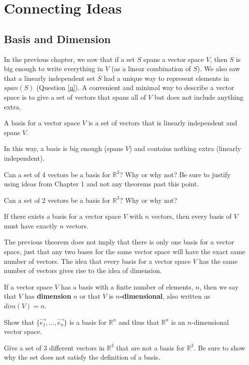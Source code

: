\chapter{Connecting Ideas}

\section{Basis and Dimension}
In the previous chapter, we saw that if a set $S$ spans a vector space $V$, then $S$ is big enough to write everything in $V$ (as a linear combination of $S$). We also saw that a linearly independent set $S$ had a unique way to represent elements in $span(S)$ (Question \ref{u}). A convenient and minimal way to describe a vector space is to give a set of vectors that spans all of $V$ but does not include anything extra.
\begin{definition} A basis for a vector space $V$ is a set of vectors that is linearly independent and spans $V$.
\end{definition}
In this way, a basis is big enough (spans $V$) and contains nothing extra (linearly independent).

\bq Can a set of 4 vectors be a basis for $\mathbb{R}^3$? Why or why not? Be sure to justify using ideas from Chapter 1 and not any theorems past this point.
\eq

\bq Can a set of 2 vectors be a basis for $\mathbb{R}^3$? Why or why not?
\eq

\begin{theorem}
If there exists a basis for a vector space $V$ with $n$ vectors, then every basis of $V$ must have exactly $n$ vectors.
\end{theorem}
The previous theorem does not imply that there is only one basis for a vector space, just that any two bases for the same vector space will have the exact same number of vectors. The idea that every basis for a vector space $V$ has the same number of vectors gives rise to the idea of dimension.
\begin{definition} If a vector space $V$ has a basis with a finite number of elements, $n$, then we say that $V$ has \textbf{dimension} $n$ or that $V$ is \textbf{$n$-dimensional}, also written as $dim(V)=n$. \end{definition}

\bq Show that $\{ \vec{e_1}, ... ,\vec{e_n} \}$ is a basis for $\mathbb{R}^n$ and thus that $\mathbb{R}^n$ is an $n$-dimensional vector space.
\eq

\bq Give a set of 3 different vectors in $\mathbb{R}^3$ that are not a basis for $\mathbb{R}^3$. Be sure to show why the set does not satisfy the definition of a basis.
\eq

